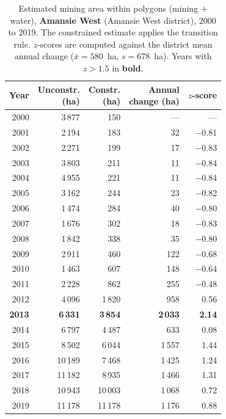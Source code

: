 \documentclass[]{interact}
\begin{document}
\begin{table}[H]
\centering
\caption{Estimated mining area within polygons (mining $+$ water), \textbf{Amansie West} (Amansie West district), 2000 to 2019. The constrained estimate applies the transition rule. $z$-scores are computed against the district mean annual change ($\bar{x} = 580$~ha, $s = 678$~ha). Years with $z > 1.5$ in \textbf{bold}.}
\label{tab:district_amansie}
\small
\begin{tabular}{@{}rrrrr@{}}
\toprule
Year & \makecell[r]{Unconstr.\\(ha)} & \makecell[r]{Constr.\\(ha)} & \makecell[r]{Annual\\change (ha)} & $z$-score \\
\midrule
      2000 & 3\,877 & 150 & --- & --- \\
      2001 & 2\,194 & 183 & 32 & $-$0.81 \\
      2002 & 2\,271 & 199 & 17 & $-$0.83 \\
      2003 & 3\,803 & 211 & 11 & $-$0.84 \\
      2004 & 4\,955 & 221 & 11 & $-$0.84 \\
      2005 & 3\,162 & 244 & 23 & $-$0.82 \\
      2006 & 1\,474 & 284 & 40 & $-$0.80 \\
      2007 & 1\,676 & 302 & 18 & $-$0.83 \\
      2008 & 1\,842 & 338 & 35 & $-$0.80 \\
      2009 & 2\,911 & 460 & 122 & $-$0.68 \\
      2010 & 1\,463 & 607 & 148 & $-$0.64 \\
      2011 & 2\,228 & 862 & 255 & $-$0.48 \\
      2012 & 4\,096 & 1\,820 & 958 & \phantom{$-$}0.56 \\
      \textbf{2013} & \textbf{6\,331} & \textbf{3\,854} & \textbf{2\,033} & \textbf{\phantom{$-$}2.14} \\
      2014 & 6\,797 & 4\,487 & 633 & \phantom{$-$}0.08 \\
      2015 & 8\,502 & 6\,044 & 1\,557 & \phantom{$-$}1.44 \\
      2016 & 10\,189 & 7\,468 & 1\,425 & \phantom{$-$}1.24 \\
      2017 & 11\,182 & 8\,935 & 1\,466 & \phantom{$-$}1.31 \\
      2018 & 10\,943 & 10\,003 & 1\,068 & \phantom{$-$}0.72 \\
      2019 & 11\,178 & 11\,178 & 1\,176 & \phantom{$-$}0.88 \\
\bottomrule
\end{tabular}
\end{table}
\end{document}
